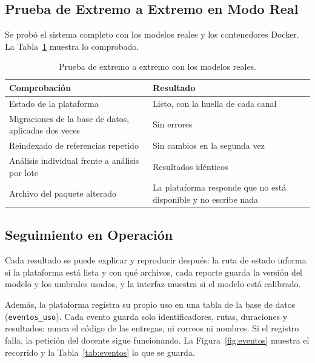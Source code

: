 \subsection{Prueba de Extremo a Extremo en Modo Real}
\label{subsec:e2e}

Se probó el sistema completo con los modelos reales y los contenedores Docker. La Tabla~\ref{tab:e2e} muestra lo comprobado.

\begin{table}[H]
    \centering
    \caption{Prueba de extremo a extremo con los modelos reales.}
    \label{tab:e2e}
    \renewcommand{\arraystretch}{1.25}
    \small
    \begin{tabularx}{\textwidth}{|>{\raggedright\arraybackslash}p{6.2cm}|X|}
        \hline
        \textbf{Comprobación} & \textbf{Resultado} \\ \hline
        Estado de la plataforma & Listo, con la huella de cada canal \\ \hline
        Migraciones de la base de datos, aplicadas dos veces & Sin errores \\ \hline
        Reindexado de referencias repetido & Sin cambios en la segunda vez \\ \hline
        Análisis individual frente a análisis por lote & Resultados idénticos \\ \hline
        Archivo del paquete alterado & La plataforma responde que no está disponible y no escribe nada \\ \hline
    \end{tabularx}
\end{table}

\subsection{Seguimiento en Operación}
\label{subsec:operacion}

Cada resultado se puede explicar y reproducir después: la ruta de estado informa si la plataforma está lista y con qué archivos, cada reporte guarda la versión del modelo y los umbrales usados, y la interfaz muestra si el modelo está calibrado.

Además, la plataforma registra su propio uso en una tabla de la base de datos (\texttt{eventos\_uso}). Cada evento guarda solo identificadores, rutas, duraciones y resultados: nunca el código de las entregas, ni correos ni nombres. Si el registro falla, la petición del docente sigue funcionando. La Figura~\ref{fig:eventos} muestra el recorrido y la Tabla~\ref{tab:eventos} lo que se guarda.

